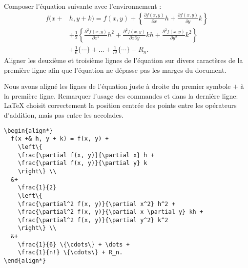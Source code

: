 \begin{exercice}
  Composer l'équation suivante avec l'environnement :
  \begin{align*}
    f(x +& h, y + k)
    = f(x, y) +
      \left\{
      \frac{\partial f(x, y)}{\partial x} h +
      \frac{\partial f(x, y)}{\partial y} k
      \right\} \\
    &+
      \frac{1}{2}
      \left\{
      \frac{\partial^2 f(x, y)}{\partial x^2} h^2 +
      \frac{\partial^2 f(x, y)}{\partial x \partial y} kh +
      \frac{\partial^2 f(x, y)}{\partial y^2} k^2
      \right\} \\
    &+
      \frac{1}{6} \{\cdots\} + \dots + \frac{1}{n!} \{\cdots\} + R_n.
  \end{align*}
  Aligner les deuxième et troisième lignes de l'équation sur divers
  caractères de la première ligne afin que l'équation ne dépasse pas
  les marges du document.
  \begin{sol}
    Nous avons aligné les lignes de l'équation juste à droite du
    premier symbole $+$ à la première ligne. Remarquer l'usage des
    commandes \cmd{\cdots} et \cmd{\dots} dans la dernière ligne:
    {\LaTeX} choisit correctement la position centrée des points entre les
    opérateurs d'addition, mais pas entre les accolades.
\begin{lstlisting}
\begin{align*}
  f(x +& h, y + k) = f(x, y) +
    \left\{
    \frac{\partial f(x, y)}{\partial x} h +
    \frac{\partial f(x, y)}{\partial y} k
    \right\} \\
  &+
    \frac{1}{2}
    \left\{
    \frac{\partial^2 f(x, y)}{\partial x^2} h^2 +
    \frac{\partial^2 f(x, y)}{\partial x \partial y} kh +
    \frac{\partial^2 f(x, y)}{\partial y^2} k^2
    \right\} \\
  &+
    \frac{1}{6} \{\cdots\} + \dots +
    \frac{1}{n!} \{\cdots\} + R_n.
\end{align*}
\end{lstlisting}
  \end{sol}
\end{exercice}

